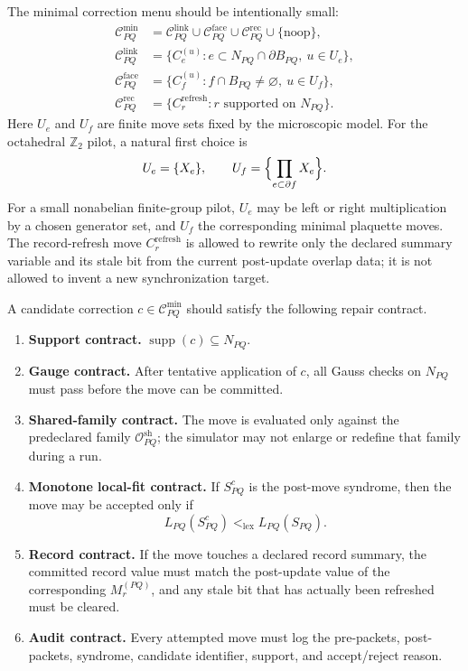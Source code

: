 \documentclass[11pt]{article}
\begin{document}
The minimal correction menu should be intentionally small:
\begin{align}
\mathcal C^{\mathrm{min}}_{PQ}
&=
\mathcal C^{\mathrm{link}}_{PQ}
\cup
\mathcal C^{\mathrm{face}}_{PQ}
\cup
\mathcal C^{\mathrm{rec}}_{PQ}
\cup
\{\mathrm{noop}\},\\
\mathcal C^{\mathrm{link}}_{PQ}
&=
\{C_{e}^{(u)}: e\subset N_{PQ}\cap \partial B_{PQ},\ u\in U_e\},\\
\mathcal C^{\mathrm{face}}_{PQ}
&=
\{C_{f}^{(u)}: f\cap B_{PQ}\neq\varnothing,\ u\in U_f\},\\
\mathcal C^{\mathrm{rec}}_{PQ}
&=
\{C_{r}^{\mathrm{refresh}}: r\text{ supported on }N_{PQ}\}.
\end{align}
Here $U_e$ and $U_f$ are finite move sets fixed by the microscopic model. For the octahedral
$\mathbb Z_2$ pilot, a natural first choice is
\begin{equation}
U_e=\{X_e\},
\qquad
U_f=\Bigl\{\prod_{e\subset\partial f}X_e\Bigr\}.
\end{equation}
For a small nonabelian finite-group pilot, $U_e$ may be left or right multiplication by a
chosen generator set, and $U_f$ the corresponding minimal plaquette moves. The record-refresh
move $C_r^{\mathrm{refresh}}$ is allowed to rewrite only the declared summary variable and its
stale bit from the current post-update overlap data; it is not allowed to invent a new
synchronization target.

A candidate correction $c\in\mathcal C^{\mathrm{min}}_{PQ}$ should satisfy the following repair
contract.
\begin{enumerate}[leftmargin=2em]
\item \textbf{Support contract.}
$\operatorname{supp}(c)\subseteq N_{PQ}$.
\item \textbf{Gauge contract.}
After tentative application of $c$, all Gauss checks on $N_{PQ}$ must pass before the move can
be committed.
\item \textbf{Shared-family contract.}
The move is evaluated only against the predeclared family $\mathcal O^{\mathrm{sh}}_{PQ}$; the
simulator may not enlarge or redefine that family during a run.
\item \textbf{Monotone local-fit contract.}
If $S_{PQ}^{c}$ is the post-move syndrome, then the move may be accepted only if
\begin{equation}
L_{PQ}(S_{PQ}^{c}) <_{\mathrm{lex}} L_{PQ}(S_{PQ}).
\end{equation}
\item \textbf{Record contract.}
If the move touches a declared record summary, the committed record value must match the
post-update value of the corresponding $M_r^{(PQ)}$, and any stale bit that has actually been
refreshed must be cleared.
\item \textbf{Audit contract.}
Every attempted move must log the pre-packets, post-packets, syndrome, candidate identifier,
support, and accept/reject reason.
\end{enumerate}
\end{document}

